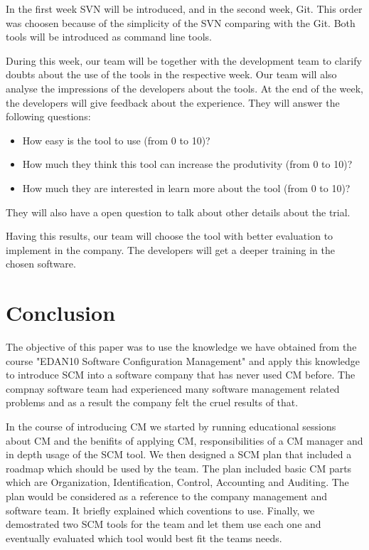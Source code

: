 \documentclass[a4paper]{article}
\begin{document}
In the first week SVN will be introduced, and in the second week, Git.
This order was choosen because of the simplicity of the SVN comparing with the Git.
Both tools will be introduced as command line tools.

During this week, our team will be together with the development team to clarify doubts about the use of the tools in the respective week. 
Our team will also analyse the impressions of the developers about the tools.
At the end of the week, the developers will give feedback about the experience. 
They will answer the following questions:
\begin{itemize}
\item How easy is the tool to use (from 0 to 10)?
\item How much they think this tool can increase the produtivity (from 0 to 10)?
\item How much they are interested in learn more about the tool (from 0 to 10)?
\end{itemize}
They will also have a open question to talk about other details about the trial.

Having this results, our team will choose the tool with better evaluation to implement in the company. 
The developers will get a deeper training in the chosen software.

\section{Conclusion}

The objective of this paper was to use the knowledge we have obtained from the course "EDAN10 Software Configuration Management" and apply this knowledge to introduce SCM into a software company that has never used CM before. The compnay software team had experienced many software management related problems and as a result the company felt the cruel results of that. 

In the course of introducing CM we started by running educational sessions about CM and the benifits of applying CM, responsibilities of a CM manager and in depth usage of the SCM tool. We then designed a SCM plan that included a roadmap which should be used by the team. The plan included basic CM parts which are Organization, Identification, Control, Accounting and Auditing. The plan would be considered as a reference to the company management and software team. It briefly explained which coventions to use. Finally, we demostrated two SCM tools for the team and let them use each one and eventually evaluated which tool would best fit the teams needs.
\end{document}
